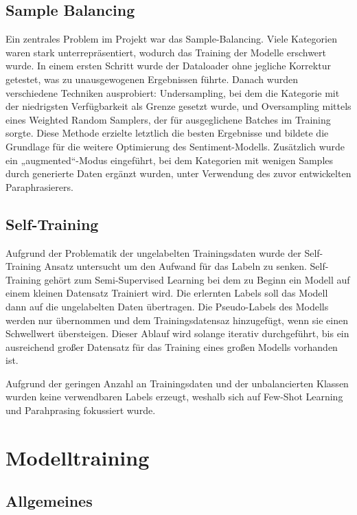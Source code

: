 \subsection{Sample Balancing}

Ein zentrales Problem im Projekt war das Sample-Balancing. Viele Kategorien waren stark
unterrepräsentiert, wodurch das Training der Modelle erschwert wurde. In einem ersten Schritt wurde
der Dataloader ohne jegliche Korrektur getestet, was zu unausgewogenen Ergebnissen führte. Danach
wurden verschiedene Techniken ausprobiert: Undersampling, bei dem die Kategorie mit der niedrigsten
Verfügbarkeit als Grenze gesetzt wurde, und Oversampling mittels eines Weighted Random Samplers, der
für ausgeglichene Batches im Training sorgte. Diese Methode erzielte letztlich die besten Ergebnisse
und bildete die Grundlage für die weitere Optimierung des Sentiment-Modells. Zusätzlich wurde ein
„augmented“-Modus eingeführt, bei dem Kategorien mit wenigen Samples durch generierte Daten ergänzt
wurden, unter Verwendung des zuvor entwickelten Paraphrasierers.

\subsection{Self-Training}

Aufgrund der Problematik der ungelabelten Trainingsdaten wurde der Self-Training Ansatz
untersucht um den Aufwand für das Labeln zu senken. Self-Training gehört zum Semi-Supervised
Learning bei dem zu Beginn ein Modell auf einem kleinen Datensatz Trainiert wird. Die
erlernten Labels soll das Modell dann auf die ungelabelten Daten übertragen. Die Pseudo-Labels
des Modells werden nur übernommen und dem Trainingsdatensaz hinzugefügt, wenn sie einen
Schwellwert übersteigen. Dieser Ablauf wird solange iterativ durchgeführt, bis ein ausreichend
großer Datensatz für das Training eines großen Modells vorhanden ist.  

Aufgrund der geringen Anzahl an Trainingsdaten und der unbalancierten Klassen wurden keine 
verwendbaren Labels erzeugt, weshalb sich auf Few-Shot Learning und Parahprasing fokussiert wurde. 

\newpage
\section{Modelltraining}

\subsection{Allgemeines}

